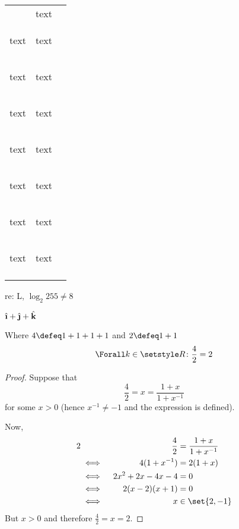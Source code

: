 \begin{longtable}{*3c}
\begin{tabular}{*2c}
\begin{footnotesize}text\end{footnotesize} &
{\footnotesize text} \\ %
\begin{small}text\end{small} &
{\small text} \\
\begin{normalsize}text\end{normalsize} &
{\normalsize text} \\ %
\begin{large}text\end{large} &
{\large text} \\
\begin{Large}text\end{Large} &
{\Large text} \\
\begin{LARGE}text\end{LARGE} &
{\LARGE text} \\
\begin{huge}text\end{huge} &
{\huge text} \\
\begin{Huge}text\end{Huge} &
{\Huge text} \\
\end{tabular} \\
\end{longtable}

re: L, \(\log_2 255 \ne 8\)

\(\uveci + \uvecj + \uveck\)

\begin{lemma}
Where \(4 \defeq 1 + 1 + 1 + 1\) and \(2 \defeq 1 + 1\)
\begin{equation*}
\Forall k \in \Reals \colon \frac 42 = 2
\end{equation*}
\end{lemma}

\begin{proof}
Suppose that
\begin{equation*}
\frac 42 = x = \frac{1 + x}{1 + x^{-1}}
\end{equation*}
for some \(x > 0\) (hence \(x^{-1} \neq -1\) and the expression is defined).

Now,
\begin{alignat*} 2
 &&\frac 42 &= \frac{1 + x}{1 + x^{-1}} \\
 &\iff{}& 4(1 + x^{-1}) &= 2(1 + x) \\
 &\iff{}& 2x^2 + 2x - 4x - 4 &= 0 \\
 &\iff{}& 2(x - 2)(x + 1) &= 0 \\
 &\iff{}& x &\in \set{2, -1} 
\end{alignat*}
But \(x > 0\) and therefore \(\frac 42 = x = 2\).
\end{proof}

